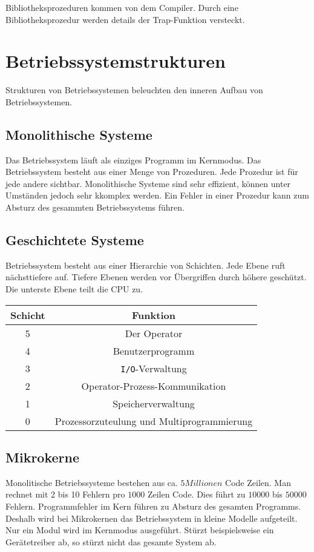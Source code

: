 Bibliotheksprozeduren kommen von dem Compiler. Durch eine Bibliotheksprozedur werden details der Trap-Funktion versteckt. 

\section{Betriebssystemstrukturen}

Strukturen von Betriebssystemen beleuchten den inneren Aufbau von Betriebssystemen.

\subsection{Monolithische Systeme}

Das Betriebssystem läuft als einziges Programm im Kernmodus. Das Betriebssystem besteht aus einer Menge von Prozeduren. Jede Prozedur ist für jede andere sichtbar. Monolithische Systeme sind sehr effizient, können unter Umständen jedoch sehr kkomplex werden. Ein Fehler in einer Prozedur kann zum Absturz des gesammten Betriebssystems führen.

\subsection{Geschichtete Systeme}

Betriebssystem besteht aus einer Hierarchie von Schichten. Jede Ebene ruft nächsttiefere auf. Tiefere Ebenen werden vor Übergriffen durch höhere geschützt. Die unterste Ebene teilt die CPU zu.

\begin{tabular}{ | c | c | }
    \hline
    Schicht & Funktion \\\hline
    5 & Der Operator \\
    4 & Benutzerprogramm \\
    3 & \texttt{I/O}-Verwaltung \\
    2 & Operator-Prozess-Kommunikation \\
    1 & Speicherverwaltung \\
    0 & Prozessorzuteulung und Multiprogrammierung \\\hline
\end{tabular}

\subsection{Mikrokerne}

Monolitische Betriebssysteme bestehen aus ca. $5 Millionen$ Code Zeilen. Man rechnet mit 2 bis 10 Fehlern pro $1000$ Zeilen Code. Dies führt zu $10000$ bis $50000$ Fehlern. Programmfehler im Kern führen zu Absturz des gesamten Programms. Deshalb wird bei Mikrokernen das Betriebssystem in kleine Modelle aufgeteilt. Nur ein Modul wird im Kernmodus ausgeführt. Stürzt beispielsweise ein Gerätetreiber ab, so stürzt nicht das gesamte System ab. 

